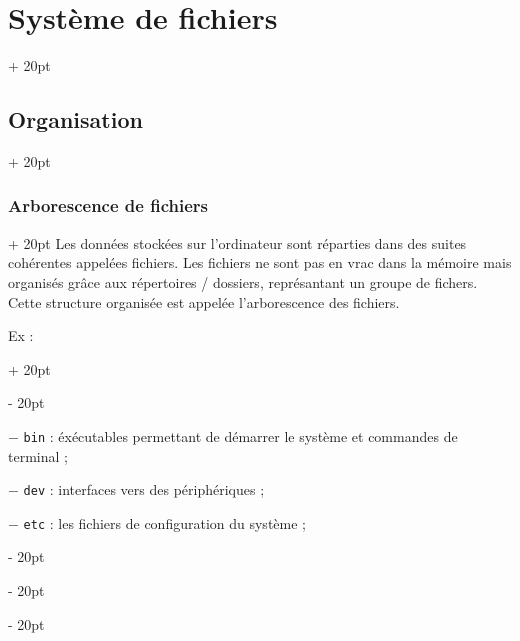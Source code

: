\documentclass[a4paper, 12pt, twoside]{article}
\newcommand{\ind}[1][20pt]{\advance\leftskip + #1}
\newcommand{\deind}[1][20pt]{\advance\leftskip - #1}
\newcommand{\indented}[2][20pt]{\par \ind[#1] #2 \par \deind[#1]}
\newenvironment{indentedenv}[1][20pt]{\par \ind[#1]}{\par \deind}
\newenvironment{indt}[2][20pt]{#2 \begin{indentedenv}[#1]}{\end{indentedenv}} %
\begin{document}
    \vspace{12pt}
    
    \begin{indt}{\section{Système de fichiers}}
        
        \begin{indt}{\subsection{Organisation}}
            \begin{indt}{\subsubsection{Arborescence de fichiers}}
                Les données stockées sur l'ordinateur sont réparties dans des suites cohérentes appelées fichiers. Les fichiers ne sont pas en vrac dans la mémoire mais organisés grâce aux répertoires / dossiers, représantant un groupe de fichers. Cette structure organisée est appelée l'arborescence des fichiers.
                
                Ex :
                
                \indented{}
                
                \vspace{6pt}
                
                $-$ \texttt{bin} : éxécutables permettant de démarrer le système et commandes de terminal ;
                
                $-$ \texttt{dev} : interfaces vers des périphériques ;
                
                $-$ \texttt{etc} : les fichiers de configuration du système ;
                

\end{indt}
\end{indt}
\end{indt}
\end{document}
